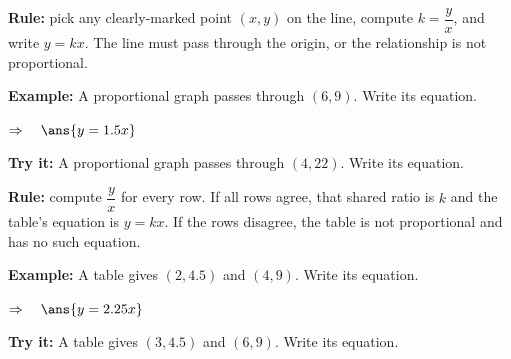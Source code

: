 \documentclass[12pt]{article}
\begin{document}


\begin{formulabox}
\textbf{Rule:} pick any clearly-marked point $(x, y)$ on the line, compute
$k = \dfrac{y}{x}$, and write $y = kx$. The line must pass through the origin,
or the relationship is not proportional.
\end{formulabox}

\begin{examplebox}
\textbf{Example:} \quad A proportional graph passes through $(6, 9)$. Write its
equation.

$\Rightarrow\quad \ans{y = 1.5x}$
\end{examplebox}

\begin{tryitbox}
\textbf{Try it:} \quad A proportional graph passes through $(4, 22)$. Write its
equation.\\[2pt]
\end{tryitbox}


\begin{formulabox}
\textbf{Rule:} compute $\dfrac{y}{x}$ for every row. If all rows agree, that
shared ratio is $k$ and the table's equation is $y = kx$. If the rows disagree,
the table is not proportional and has no such equation.
\end{formulabox}

\begin{examplebox}
\textbf{Example:} \quad A table gives $(2, 4.5)$ and $(4, 9)$. Write its
equation.

$\Rightarrow\quad \ans{y = 2.25x}$
\end{examplebox}

\begin{tryitbox}
\textbf{Try it:} \quad A table gives $(3, 4.5)$ and $(6, 9)$. Write its
equation.\\[2pt]
\end{tryitbox}
\end{document}
